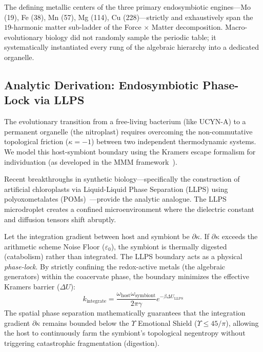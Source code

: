 \begin{result}
The defining metallic centers of the three primary endosymbiotic engines---Mo (19), Fe (38), Mn (57), Mg (114), Cu (228)---strictly and exhaustively span the $19$-harmonic matter sub-ladder of the Force $\times$ Matter decomposition. Macro-evolutionary biology did not randomly sample the periodic table; it systematically instantiated every rung of the algebraic hierarchy into a dedicated organelle.
\end{result}

\subsection{Analytic Derivation: Endosymbiotic Phase-Lock via LLPS}

The evolutionary transition from a free-living bacterium (like UCYN-A) to a permanent organelle (the nitroplast) requires overcoming the non-commutative topological friction ($\kappa = -1$) between two independent thermodynamic systems. We model this host-symbiont boundary using the Kramers escape formalism for individuation (as developed in the MMM framework~\cite{LaRue_PP}). 

Recent breakthroughs in synthetic biology---specifically the construction of artificial chloroplasts via Liquid-Liquid Phase Separation (LLPS) using polyoxometalates (POMs)~\cite{china_artificial_chloroplast}---provide the analytic analogue. The LLPS microdroplet creates a confined microenvironment where the dielectric constant and diffusion tensors shift abruptly. 

Let the integration gradient between host and symbiont be $\partial\kappa$. If $\partial\kappa$ exceeds the arithmetic scheme Noise Floor ($\varepsilon_0$), the symbiont is thermally digested (catabolism) rather than integrated. The LLPS boundary acts as a physical \emph{phase-lock}. By strictly confining the redox-active metals (the algebraic generators) within the coacervate phase, the boundary minimizes the effective Kramers barrier ($\Delta U$):
\begin{equation}
    k_{\mathrm{integrate}} = \frac{\omega_{\text{host}} \omega_{\text{symbiont}}}{2\pi\gamma} e^{-\beta \Delta U_{\mathrm{LLPS}}}
\end{equation}
The spatial phase separation mathematically guarantees that the integration gradient $\partial\kappa$ remains bounded below the $\Upsilon$ Emotional Shield ($\Upsilon \le 45/\pi$), allowing the host to continuously farm the symbiont's topological negentropy without triggering catastrophic fragmentation (digestion).


